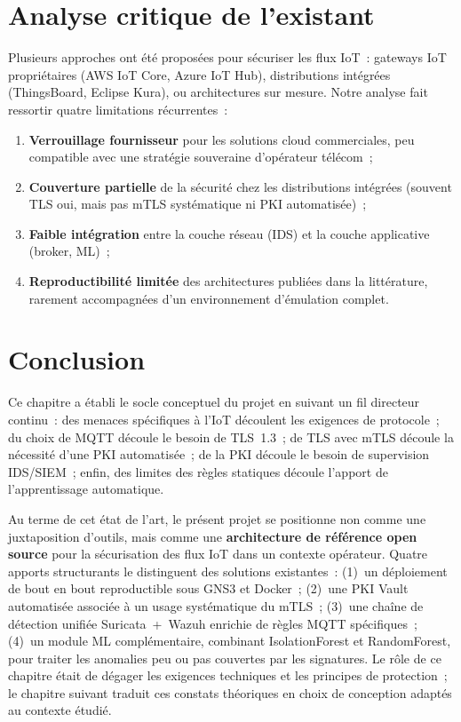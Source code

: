 \section{Analyse critique de l'existant}
\label{sec:ea-analyse}

Plusieurs approches ont été proposées pour sécuriser les flux IoT~: gateways IoT propriétaires (AWS IoT Core, Azure IoT Hub), distributions intégrées (ThingsBoard, Eclipse Kura), ou architectures sur mesure. Notre analyse fait ressortir quatre limitations récurrentes~:

\begin{enumerate}[leftmargin=*]
  \item \textbf{Verrouillage fournisseur} pour les solutions cloud commerciales, peu compatible avec une stratégie souveraine d'opérateur télécom~;
  \item \textbf{Couverture partielle} de la sécurité chez les distributions intégrées (souvent TLS oui, mais pas mTLS systématique ni PKI automatisée)~;
  \item \textbf{Faible intégration} entre la couche réseau (IDS) et la couche applicative (broker, ML)~;
  \item \textbf{Reproductibilité limitée} des architectures publiées dans la littérature, rarement accompagnées d'un environnement d'émulation complet.
\end{enumerate}

\section{Conclusion}
\label{sec:ea-conclusion}
\label{sec:ea-positionnement}

Ce chapitre a établi le socle conceptuel du projet en suivant un fil directeur continu~: des menaces spécifiques à l'IoT découlent les exigences de protocole~; du choix de MQTT découle le besoin de TLS~1.3~; de TLS avec mTLS découle la nécessité d'une PKI automatisée~; de la PKI découle le besoin de supervision IDS/SIEM~; enfin, des limites des règles statiques découle l'apport de l'apprentissage automatique.

Au terme de cet état de l'art, le présent projet se positionne non comme une juxtaposition d'outils, mais comme une \textbf{architecture de référence open source} pour la sécurisation des flux IoT dans un contexte opérateur. Quatre apports structurants le distinguent des solutions existantes~: (1)~un déploiement de bout en bout reproductible sous GNS3 et Docker~; (2)~une PKI Vault automatisée associée à un usage systématique du mTLS~; (3)~une chaîne de détection unifiée Suricata~+~Wazuh enrichie de règles MQTT spécifiques~; (4)~un module ML complémentaire, combinant IsolationForest et RandomForest, pour traiter les anomalies peu ou pas couvertes par les signatures. Le rôle de ce chapitre était de dégager les exigences techniques et les principes de protection~; le chapitre suivant traduit ces constats théoriques en choix de conception adaptés au contexte étudié.
